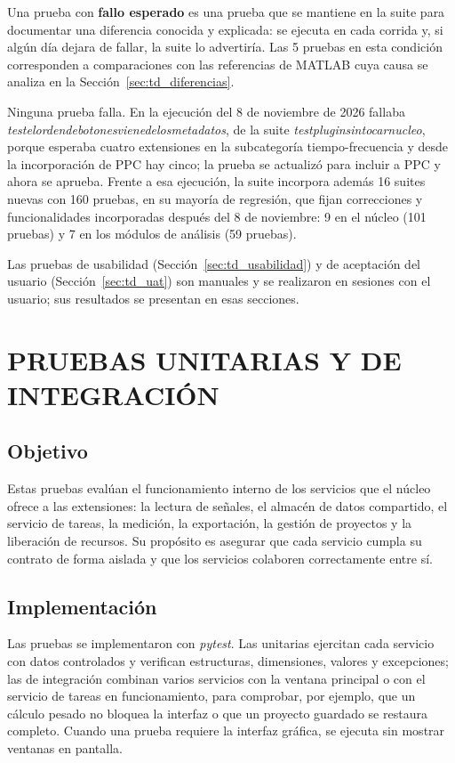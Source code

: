 \documentclass[12pt,letterpaper,oneside]{article}
\DeclareRobustCommand{\_}{\textunderscore\allowbreak}
\newcommand{\capitulo}[1]{\clearpage\section{#1}}
\begin{document}
Una prueba con \textbf{fallo esperado} es una prueba que se mantiene en la suite para documentar una diferencia conocida y explicada: se ejecuta en cada corrida y, si algún día dejara de fallar, la suite lo advertiría. Las 5 pruebas en esta condición corresponden a comparaciones con las referencias de MATLAB cuya causa se analiza en la Sección~\ref{sec:td_diferencias}.

Ninguna prueba falla. En la ejecución del 8 de noviembre de 2026 fallaba \textit{test\_el\_orden\_de\_botones\_viene\_de\_los\_metadatos}, de la suite \textit{test\_plugin\_sin\_tocar\_nucleo}, porque esperaba cuatro extensiones en la subcategoría tiempo-frecuencia y desde la incorporación de PPC hay cinco; la prueba se actualizó para incluir a PPC y ahora se aprueba. Frente a esa ejecución, la suite incorpora además 16 suites nuevas con 160 pruebas, en su mayoría de regresión, que fijan correcciones y funcionalidades incorporadas después del 8 de noviembre: 9 en el núcleo (101 pruebas) y 7 en los módulos de análisis (59 pruebas).

Las pruebas de usabilidad (Sección~\ref{sec:td_usabilidad}) y de aceptación del usuario (Sección~\ref{sec:td_uat}) son manuales y se realizaron en sesiones con el usuario; sus resultados se presentan en esas secciones.
\capitulo{PRUEBAS UNITARIAS Y DE INTEGRACIÓN}
\label{sec:td_unitarias}

\subsection{Objetivo}
Estas pruebas evalúan el funcionamiento interno de los servicios que el núcleo ofrece a las extensiones: la lectura de señales, el almacén de datos compartido, el servicio de tareas, la medición, la exportación, la gestión de proyectos y la liberación de recursos. Su propósito es asegurar que cada servicio cumpla su contrato de forma aislada y que los servicios colaboren correctamente entre sí.

\subsection{Implementación}
Las pruebas se implementaron con \textit{pytest}. Las unitarias ejercitan cada servicio con datos controlados y verifican estructuras, dimensiones, valores y excepciones; las de integración combinan varios servicios con la ventana principal o con el servicio de tareas en funcionamiento, para comprobar, por ejemplo, que un cálculo pesado no bloquea la interfaz o que un proyecto guardado se restaura completo. Cuando una prueba requiere la interfaz gráfica, se ejecuta sin mostrar ventanas en pantalla.
\end{document}
